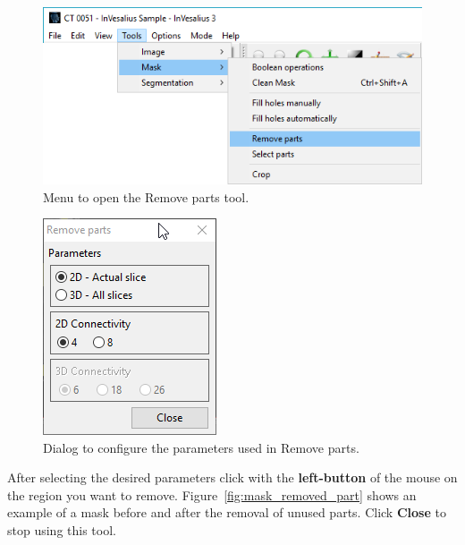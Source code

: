 \begin{figure}[!htb]
\centering
\includegraphics[scale=0.4]{../user_guide_figures/invesalius_screen/menu_mask_remove_part_en.png}
\caption{Menu to open the Remove parts tool.}
\label{fig:menu_mask_remove_part}
\end{figure}

\begin{figure}[!htb]
\centering
\includegraphics[scale=0.7]{../user_guide_figures/invesalius_screen/mask_remove_parts_window_en.png}
\caption{Dialog to configure the parameters used in Remove parts.}
\label{fig:mask_remove_parts_window}
\end{figure}

After selecting the desired parameters click with the \textbf{left-button} of the mouse on the region you want to remove. Figure~\ref{fig:mask_removed_part} shows an example of a mask before and after the removal of unused parts. Click \textbf{Close} to stop using this tool.

